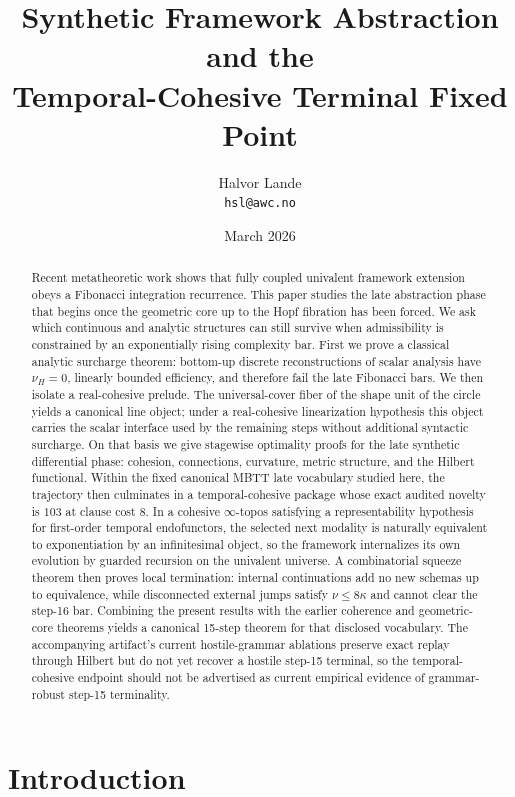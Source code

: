 \documentclass[11pt]{article}
\title{\textbf{Synthetic Framework Abstraction and the\\ Temporal-Cohesive Terminal Fixed Point}}
\author{Halvor Lande\\\texttt{hsl@awc.no}}
\date{March 2026}
\theoremstyle{plain}
\theoremstyle{definition}
\theoremstyle{remark}
\begin{document}
\maketitle

\begin{abstract}
Recent metatheoretic work shows that fully coupled univalent framework extension obeys a Fibonacci integration recurrence. This paper studies the late abstraction phase that begins once the geometric core up to the Hopf fibration has been forced. We ask which continuous and analytic structures can still survive when admissibility is constrained by an exponentially rising complexity bar. First we prove a classical analytic surcharge theorem: bottom-up discrete reconstructions of scalar analysis have $\nu_H=0$, linearly bounded efficiency, and therefore fail the late Fibonacci bars. We then isolate a real-cohesive prelude. The universal-cover fiber of the shape unit of the circle yields a canonical line object; under a real-cohesive linearization hypothesis this object carries the scalar interface used by the remaining steps without additional syntactic surcharge. On that basis we give stagewise optimality proofs for the late synthetic differential phase: cohesion, connections, curvature, metric structure, and the Hilbert functional. Within the fixed canonical MBTT late vocabulary studied here, the trajectory then culminates in a temporal-cohesive package whose exact audited novelty is $103$ at clause cost $8$. In a cohesive $\infty$-topos satisfying a representability hypothesis for first-order temporal endofunctors, the selected next modality is naturally equivalent to exponentiation by an infinitesimal object, so the framework internalizes its own evolution by guarded recursion on the univalent universe. A combinatorial squeeze theorem then proves local termination: internal continuations add no new schemas up to equivalence, while disconnected external jumps satisfy $\nu\le 8\kappa$ and cannot clear the step-16 bar. Combining the present results with the earlier coherence and geometric-core theorems yields a canonical 15-step theorem for that disclosed vocabulary. The accompanying artifact's current hostile-grammar ablations preserve exact replay through Hilbert but do not yet recover a hostile step-15 terminal, so the temporal-cohesive endpoint should not be advertised as current empirical evidence of grammar-robust step-15 terminality.
\end{abstract}

\section{Introduction}
\end{document}
